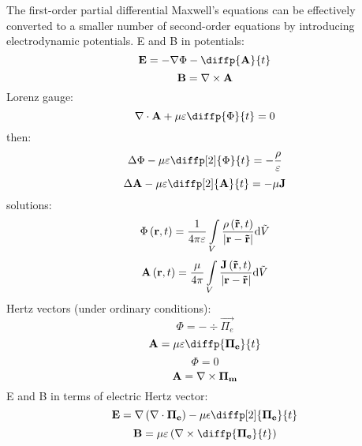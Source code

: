 The first-order partial differential Maxwell's equations can be effectively converted to a smaller number of second-order equations by introducing electrodynamic potentials.
E and B in potentials:
\begin{equation}
\vec{E} = -\grad{\Phi} - \diffp{\vec{A}}{t}
\end{equation}
\begin{equation}
\mathbf{B} = \nabla \times \mathbf{A}
\end{equation}
Lorenz gauge:
\begin{equation}
\div{\vec{A}} + \mu \varepsilon \diffp{\Phi}{t} = 0
\end{equation}
then:
\begin{equation}
\laplace{\Phi} - \mu \varepsilon \diffp[2]{\Phi}{t} = -\frac{\rho}{\varepsilon}
\end{equation}
\begin{equation}
\laplace{\vec{A}} - \mu \varepsilon \diffp[2]{\vec{A}}{t} = -\mu \vec{J}
\end{equation}
solutions:
\begin{equation}
\Phi\left(\mathbf{r}, t \right) = \frac{1}{4 \pi \varepsilon} \int\limits_{V} \frac{\rho\left(\mathbf{\tilde{r}}, t \right)}{\lvert\mathbf{r} - \mathbf{\tilde{r}}\rvert} \mathrm{d} \tilde{V}
\end{equation}
\begin{equation}
\mathbf{A}\left(\mathbf{r}, t \right) = \frac{\mu}{4 \pi} \int\limits_{V} \frac{\mathbf{J}\left(\mathbf{\tilde{r}}, t \right)}{\lvert\mathbf{r} - \mathbf{\tilde{r}}\rvert} \mathrm{d} \tilde{V}
\end{equation}
Hertz vectors (under ordinary conditions):
\begin{equation}
\Phi = - \div{\vec{\Pi_e}}
\end{equation}
\begin{equation}
\vec{A} = \mu \varepsilon \diffp{\vec{\Pi_e}}{t}
\end{equation}
\begin{equation}
\Phi = 0
\end{equation}
\begin{equation}
\mathbf{A} = \nabla \times \mathbf{\Pi_m}
\end{equation}
E and B in terms of electric Hertz vector:
\begin{equation}
\vec{E} = \grad{\left(\div{\vec{\Pi_e}}\right)} - \mu \epsilon \diffp[2]{\vec{\Pi_e}}{t}
\end{equation}
\begin{equation}
\vec{B} = \mu \varepsilon \left(\rot{\diffp{\vec{\Pi_e}}{t}}\right)
\end{equation}
